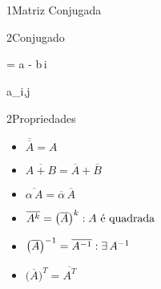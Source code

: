 \part{}




\begin{sectionBox}1{Matriz Conjugada}

    \begin{sectionBox}2{Conjugado}
        \begin{BM}
             = a - b\,i
        \end{BM}
    \end{sectionBox}

    \begin{BM}
         \implies a_{i,j} \to {}
    \end{BM}

    \begin{sectionBox}2{Propriedades}
        \begin{itemize}
            \item \( \overline{\overline{A}}     = A \)
            \item \( \overline{A + B}            = \overline{A} + \overline{B} \)
            \item \( \overline{\alpha\,A}        = \overline{\alpha}\,\overline{A} \)
            \item \( \overline{A^k}              = \big(\overline{A}\big)^k \hfill : A\text{ é quadrada} \)
            \item \( \big(\overline{A}\big)^{-1} = \overline{A^{-1}}        \hfill : \exists\,A^{-1} \)
            \item \( \big(\overline{A}\big)^T    = \overline{A^T} \)
        \end{itemize}
    \end{sectionBox}


\end{sectionBox}



